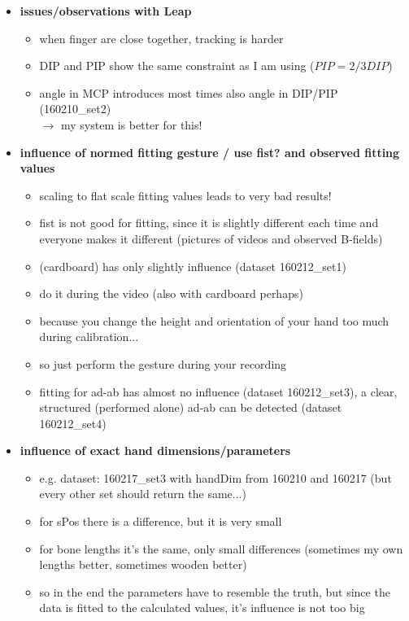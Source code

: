 \begin{itemize}
\item \textbf{issues/observations with Leap}
	\begin{itemize}
	\item when finger are close together, tracking is harder
	\item DIP and PIP show the same constraint as I am using ($ PIP = 2/3 DIP $)
	\item angle in MCP introduces most times also angle in DIP/PIP (160210\_set2) \\
			$ \rightarrow $ my system is better for this!
	\end{itemize}

%
\item \textbf{influence of normed fitting gesture / use fist? and observed fitting values}
	\begin{itemize}
	\item scaling to flat scale fitting values leads to very bad results!
	\item fist is not good for fitting, since it is slightly different each time and everyone makes it different (pictures of videos and observed B-fields)
	\item (cardboard) has only slightly influence (dataset 160212\_set1)
	\item do it during the video (also with cardboard perhaps)
	\item because you change the height and orientation of your hand too much during calibration...
	\item so just perform the gesture during your recording
	\item fitting for ad-ab has almost no influence (dataset 160212\_set3), a clear, structured (performed alone) ad-ab can be detected (dataset 160212\_set4)
	\end{itemize}

%
\item \textbf{influence of exact hand dimensions/parameters}
	\begin{itemize}
	\item e.g. dataset: 160217\_set3 with handDim from 160210 and 160217 (but every other set should return the same...)
	\item for sPos there is a difference, but it is very small
	\item for bone lengths it's the same, only small differences (sometimes my own lengths better, sometimes wooden better)
	\item so in the end the parameters have to resemble the truth, but since the data is fitted to the calculated values, it's influence is not too big
	\end{itemize}


\end{itemize}
